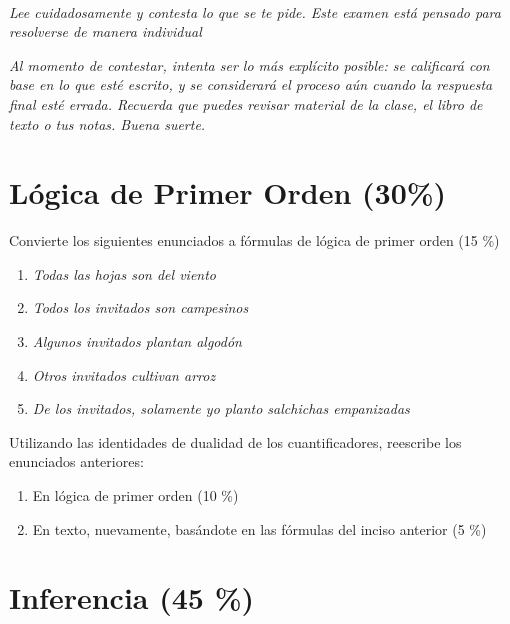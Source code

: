 \documentclass{article}
\title{
    \myclass \\
    \textbf{\mytitle} \\
    \myheader
    \date{}
}
\begin{document}
\maketitle

\vspace{-1.5cm}

{%
\footnotesize
\textit{Lee cuidadosamente y contesta lo que se te pide.
Este examen está pensado para resolverse de manera individual}

\textit{Al momento de contestar, intenta ser lo más explícito posible: se calificará con base en lo que esté escrito, y se considerará el proceso aún cuando la respuesta final esté errada.
Recuerda que puedes revisar material de la clase, el libro de texto o tus notas.
Buena suerte.}
}

\section{Lógica de Primer Orden (30\%)}

Convierte los siguientes enunciados a fórmulas de lógica de primer orden (15 \%)

\begin{enumerate}[label=\tt \alph*)]
    \itemsep0em
    \item \textit{Todas las hojas son del viento}
    \item \textit{Todos los invitados son campesinos}
    \item \textit{Algunos invitados plantan algodón}
    \item \textit{Otros invitados cultivan arroz}
    \item \textit{De los invitados, solamente yo planto salchichas empanizadas}
\end{enumerate}

Utilizando las identidades de dualidad de los cuantificadores, reescribe los enunciados anteriores:

\begin{enumerate}[label=\tt \alph*)]
    \item En lógica de primer orden (10 \%)
    \item En texto, nuevamente, basándote en las fórmulas del inciso anterior (5 \%)
\end{enumerate}

\section{Inferencia (45 \%)}
\end{document}
